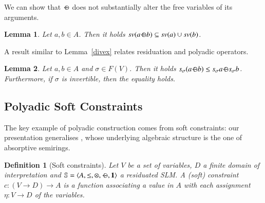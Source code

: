 \documentclass[preprint,12pt]{elsarticle}
\newtheorem{definition}{Definition}
\newtheorem{remark}{Remark}
\newtheorem{lemma}{Lemma}
\def\monid{{\mathbf 0}}
\def\monop{\otimes}
\def\odiv{\, {\ominus\hspace{-7.7pt} \div} \,}
\def\monid{\mathbf{1}}
\begin{document}
We can show that $\odiv$ does not substantially alter the free variables of its arguments.

\begin{lemma}
	Let $a, b \in A$. Then it holds $sv(a \odiv b) \subseteq sv(a) \cup sv(b)$. 
\end{lemma}



%

A result similar to Lemma~\ref{divex} relates residuation and polyadic operators.


\begin{lemma}
	Let $a, b \in A$ and $\sigma \in F(V)$. Then it holds
	$s_\sigma (a \odiv b) \leq s_\sigma a \odiv s_\sigma b$.
	Furthermore, if $\sigma$ is invertible, then the equality holds.
\end{lemma}

\subsection{Polyadic Soft Constraints}\label{sec:softconstraints}
\label{subsec:inst} 
The key example of polyadic construction comes from soft constraints: 
our presentation generalises \cite{scc},
whose underlying algebraic structure is the one of absorptive semirings.

\begin{definition}[Soft constraints]\label{def:softconstraints}
	Let $V$ be a set of variables, $D$ a finite domain of interpretation
	and ${\mathbb S} = \langle A, \leq, \monop, \odiv, \monid \rangle$ a residuated SLM.
	A \emph{(soft) constraint} $c: (V \rightarrow D) \rightarrow
	A$ is a function associating a value in $A$ with each assignment
	$\eta: V\rightarrow D$ of the variables.
\end{definition}
\end{document}
